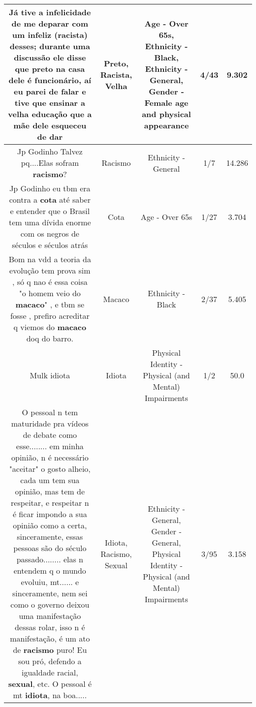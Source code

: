 \documentclass[11pt]{article}
\newlength\mylength
\begin{document}
\begin{center}
\begin{longtable}{|C{.65\mylength}|C{.30\mylength}|C{.12\mylength}|C{.12\mylength}|C{.12\mylength}|}
  \small Já tive a infelicidade de me deparar com um infeliz (\textbf{racista}) desses; durante uma discussão ele disse que \textbf{preto} na casa dele é funcionário, aí eu parei de falar e tive que ensinar a \textbf{v\textbf{elha}} educação que a mãe dele esqueceu de dar\normalsize   & Preto, Racista, Velha & Age - Over 65s, Ethnicity - Black, Ethnicity - General, Gender - Female age and physical appearance & 4/43 & 9.302 \\  \hline
  \small Jp Godinho Talvez pq....Elas sofram \textbf{racismo}?\normalsize   & Racismo & Ethnicity - General & 1/7 & 14.286 \\  \hline
  \small Jp Godinho eu tbm era contra a \textbf{cota} até saber e entender que o Brasil tem uma dívida enorme com os negros de séculos e séculos atrás\normalsize   & Cota & Age - Over 65s & 1/27 & 3.704 \\  \hline
  \small Bom na vdd a teoria da evolução tem prova sim , só q nao é essa coisa "o homem veio do \textbf{macaco}" , e tbm se fosse , prefiro acreditar q viemos do \textbf{macaco} doq do barro.\normalsize   & Macaco & Ethnicity - Black & 2/37 & 5.405 \\  \hline
  \small Mulk idiota\normalsize   & Idiota & Physical Identity - Physical (and Mental) Impairments & 1/2 & 50.0 \\  \hline
  \small O pessoal n tem maturidade pra vídeos de debate como esse........ em minha opinião, n é necessário "aceitar" o gosto alheio, cada um tem sua opinião, mas tem de respeitar, e respeitar n é ficar impondo a sua opinião como a certa, sinceramente, essas pessoas são do século passado........ elas n entendem q o mundo evoluiu, mt...... e sinceramente, nem sei como o governo deixou uma manifestação dessas rolar, isso n é manifestação, é um ato de \textbf{racismo} puro! Eu sou pró, defendo a igualdade racial, \textbf{sexual}, etc. O pessoal é mt \textbf{idiota}, na boa.....\normalsize   & Idiota, Racismo, Sexual & Ethnicity - General, Gender - General, Physical Identity - Physical (and Mental) Impairments & 3/95 & 3.158 \\  \hline

\end{longtable}
\end{center}
\end{document}
